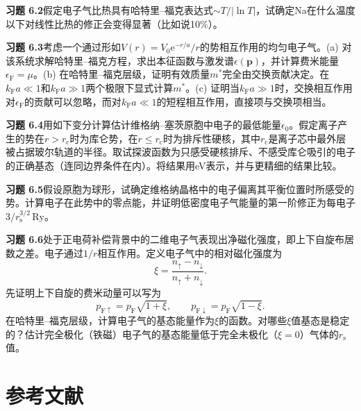 \textbf{习题 6.2}\quad 假定电子气比热具有哈特里–福克表达式$\sim T/|\ln T|$，试确定Na在什么温度以下对线性比热的修正会变得显著（比如说10\%）。

\textbf{习题 6.3}\quad 考虑一个通过形如$V(r) = V_0\mathrm{e}^{-r/a}/r$的势相互作用的均匀电子气。(a) 对该系统求解哈特里–福克方程，求出本征函数与激发谱$\epsilon(\mathbf{p})$，并计算费米能量$\epsilon_{\mathrm{F}} = \mu$。(b) 在哈特里–福克层级，证明有效质量$m^*$完全由交换贡献决定。在$k_{\mathrm{F}}a \ll 1$和$k_{\mathrm{F}}a \gg 1$两个极限下显式计算$m^*$。(c) 证明当$k_{\mathrm{F}}a \gg 1$时，交换相互作用对$\epsilon_{\mathrm{F}}$的贡献可以忽略，而对$k_{\mathrm{F}}a \ll 1$的短程相互作用，直接项与交换项相当。

\textbf{习题 6.4}\quad 用如下变分计算估计维格纳–塞茨原胞中电子的最低能量$\epsilon_0$。假定离子产生的势在$r > r_{\mathrm{c}}$时为库仑势，在$r \le r_{\mathrm{c}}$时为排斥性硬核，其中$r_{\mathrm{c}}$是离子芯中最外层被占据玻尔轨道的半径。取试探波函数为只感受硬核排斥、不感受库仑吸引的电子的正确基态（连同边界条件在内）。将结果用eV表示，并与更精细的结果比较。

\textbf{习题 6.5}\quad 假设原胞为球形，试确定维格纳晶格中的电子偏离其平衡位置时所感受的势。计算电子在此势中的零点能，并证明低密度电子气能量的第一阶修正为每电子$3/r_{\mathrm{s}}^{3/2}\,\mathrm{Ry}$。

\textbf{习题 6.6}\quad 处于正电荷补偿背景中的二维电子气表现出净磁化强度，即上下自旋布居数之差。电子通过$1/r$相互作用。定义电子气中的相对磁化强度为
\begin{equation*}
\xi = \frac{n_\uparrow - n_\downarrow}{n_\uparrow + n_\downarrow}.
\tag{6.43}
\end{equation*}
先证明上下自旋的费米动量可以写为
\begin{equation*}
p_{\mathrm{F}\uparrow} = p_{\mathrm{F}}\sqrt{1 + \xi},\qquad p_{\mathrm{F}\downarrow} = p_{\mathrm{F}}\sqrt{1 - \xi}.
\tag{6.44}
\end{equation*}
在哈特里–福克层级，计算电子气的基态能量作为$\xi$的函数。对哪些$\xi$值基态是稳定的？估计完全极化（铁磁）电子气的基态能量低于完全未极化（$\xi = 0$）气体的$r_{\mathrm{s}}$值。

\section*{参考文献}

